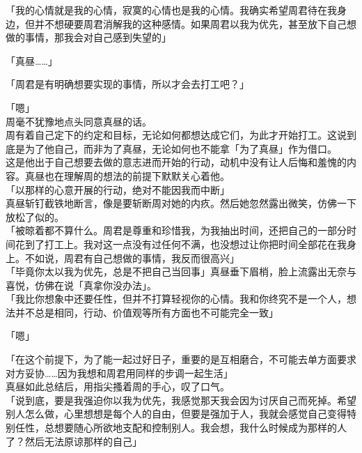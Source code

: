 「我的心情就是我的心情，寂寞的心情也是我的心情。我确实希望周君待在我身边，但并不想硬要周君消解我的这种感情。如果周君以我为优先，甚至放下自己想做的事情，那我会对自己感到失望的」

「真昼……」

「周君是有明确想要实现的事情，所以才会去打工吧？」

「嗯」\\

周毫不犹豫地点头同意真昼的话。\\

周有着自己定下的约定和目标，无论如何都想达成它们，为此才开始打工。这说到底是为了他自己，而非为了真昼，无论如何也不能拿「为了真昼」作为借口。\\

这是他出于自己想要去做的意志进而开始的行动，动机中没有让人后悔和羞愧的内容。真昼也在理解周的想法的前提下默默关心着他。\\

「以那样的心意开展的行动，绝对不能因我而中断」\\

真昼斩钉截铁地断言，像是要斩断周对她的内疚。然后她忽然露出微笑，仿佛一下放松了似的。\\

「被晾着都不算什么。周君是尊重和珍惜我，为我抽出时间，还把自己的一部分时间花到了打工上。我对这一点没有过任何不满，也没想过让你把时间全部花在我身上。不如说，周君有自己想做的事情，我反而很高兴」\\

「毕竟你太以我为优先，总是不把自己当回事」真昼垂下眉梢，脸上流露出无奈与喜悦，仿佛在说「真拿你没办法」。\\

「我比你想象中还要任性，但并不打算轻视你的心情。我和你终究不是一个人，想法并不总是相同，行动、价值观等所有方面也不可能完全一致」

「嗯」

「在这个前提下，为了能一起过好日子，重要的是互相磨合，不可能去单方面要求对方妥协……因为我想和周君用同样的步调一起生活」\\

真昼如此总结后，用指尖搔着周的手心，叹了口气。\\

「说到底，要是我强迫你以我为优先，我感觉那天我会因为讨厌自己而死掉。希望别人怎么做，心里想想是每个人的自由，但要是强加于人，我就会感觉自己变得特别任性，总想要随心所欲地支配和控制别人。我会想，我什么时候成为那样的人了？然后无法原谅那样的自己」\\

